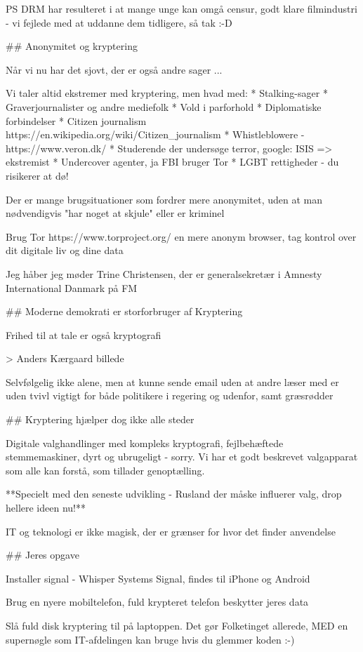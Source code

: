 \documentclass[20pt,landscape,a4paper,footrule]{foils}
\begin{document}
PS DRM har resulteret i at mange unge kan omgå censur, godt klare filmindustri - vi fejlede med at uddanne dem tidligere, så tak :-D

## Anonymitet og kryptering

Når vi nu har det sjovt, der er også andre sager ...

Vi taler altid ekstremer med kryptering, men hvad med:
* Stalking-sager
* Graverjournalister og andre mediefolk
* Vold i parforhold
* Diplomatiske forbindelser
* Citizen journalism https://en.wikipedia.org/wiki/Citizen_journalism
* Whistleblowere - https://www.veron.dk/
* Studerende der undersøge terror, google: ISIS => ekstremist
* Undercover agenter, ja FBI bruger Tor
* LGBT rettigheder - du risikerer at dø!


Der er mange brugsituationer som fordrer mere anonymitet, uden at man nødvendigvis "har noget at skjule" eller er kriminel

Brug Tor https://www.torproject.org/ en mere anonym browser, tag kontrol over dit digitale liv og dine data

Jeg håber jeg møder Trine Christensen, der er generalsekretær i Amnesty International Danmark på FM

## Moderne demokrati er storforbruger af Kryptering

Frihed til at tale er også kryptografi

> Anders Kærgaard billede

Selvfølgelig ikke alene, men at kunne sende email uden at andre læser med er uden tvivl vigtigt for både politikere i regering og udenfor, samt græsrødder

## Kryptering hjælper dog ikke alle steder

Digitale valghandlinger med kompleks kryptografi, fejlbehæftede stemmemaskiner, dyrt og ubrugeligt - sorry. Vi har et godt beskrevet valgapparat som alle kan forstå, som tillader genoptælling.

**Specielt med den seneste udvikling - Rusland der måske influerer valg, drop hellere ideen nu!**

IT og teknologi er ikke magisk, der er grænser for hvor det finder anvendelse

## Jeres opgave

Installer signal - Whisper Systems Signal, findes til iPhone og Android

Brug en nyere mobiltelefon, fuld krypteret telefon beskytter jeres data

Slå fuld disk kryptering til på laptoppen. Det gør Folketinget allerede, MED en supernøgle som IT-afdelingen kan bruge hvis du glemmer koden :-)
\end{document}
